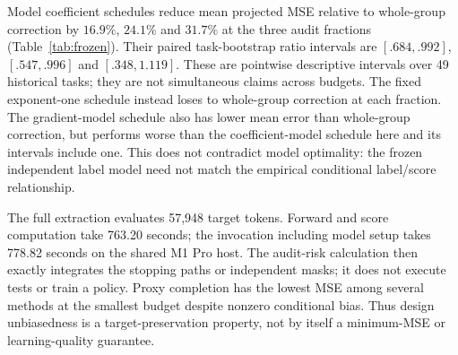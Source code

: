 Model coefficient schedules reduce mean projected MSE relative to whole-group correction by $16.9\%$, $24.1\%$ and $31.7\%$ at the three audit fractions (Table~\ref{tab:frozen}). Their paired task-bootstrap ratio intervals are $[.684,.992]$, $[.547,.996]$ and $[.348,1.119]$. These are pointwise descriptive intervals over 49 historical tasks; they are not simultaneous claims across budgets. The fixed exponent-one schedule instead loses to whole-group correction at each fraction. The gradient-model schedule also has lower mean error than whole-group correction, but performs worse than the coefficient-model schedule here and its intervals include one. This does not contradict model optimality: the frozen independent label model need not match the empirical conditional label/score relationship.

The full extraction evaluates 57,948 target tokens. Forward and score computation take 763.20 seconds; the invocation including model setup takes 778.82 seconds on the shared M1 Pro host. The audit-risk calculation then exactly integrates the stopping paths or independent masks; it does not execute tests or train a policy. Proxy completion has the lowest MSE among several methods at the smallest budget despite nonzero conditional bias. Thus design unbiasedness is a target-preservation property, not by itself a minimum-MSE or learning-quality guarantee.
